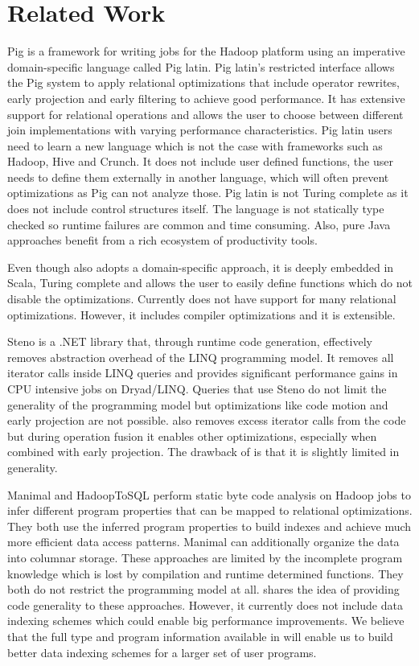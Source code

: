 \section{Related Work}
\label{sec:related-work}

Pig \cite{olston_pig_2008-1} is a framework for writing jobs for the Hadoop
platform using an imperative domain-specific language called Pig latin. Pig
latin's restricted interface allows the Pig system to apply relational
optimizations that include operator rewrites, early projection and early
filtering to achieve good performance.
It has extensive support for relational operations and allows the user to choose
between different join implementations with varying performance characteristics.
Pig latin users need to learn a new language which is not the case with
frameworks such as Hadoop, Hive and Crunch. It does not include user defined
functions, the user needs to define them externally in another language, which
will often prevent optimizations as Pig can not analyze those. Pig latin is not
Turing complete as it does not include control structures itself.
The language is not statically type checked so runtime failures are common and
time consuming. Also, pure Java approaches benefit from a rich ecosystem of
productivity tools.

Even though \tool also adopts a domain-specific approach, it is deeply embedded
in Scala, Turing complete and allows the user to easily define functions which
do not disable the optimizations. Currently \tool does not have support for many
relational optimizations. However, it includes compiler optimizations and it is
extensible.

Steno \cite{murray_steno:_2011} is a .NET library that, through runtime code
generation, effectively removes abstraction overhead of the LINQ programming
model. It removes all iterator calls inside LINQ queries and provides
significant performance gains in CPU intensive jobs on Dryad/LINQ. Queries that
use Steno do not limit the generality of the programming model but optimizations
like code motion and early projection are not possible.
\tool also removes excess iterator calls from the code but during operation
fusion it enables other optimizations, especially when combined with early
projection. The drawback of \tool is that it is slightly limited in generality.

Manimal \cite{jahani_automatic_2011} and HadoopToSQL \cite{iu_hadooptosql:_2010}
perform static byte code analysis on Hadoop jobs to infer different program
properties that can be mapped to relational optimizations. They both use the
inferred program properties to build indexes and achieve much more efficient
data access patterns. Manimal can additionally organize the data into columnar
storage. These approaches are limited by the incomplete program knowledge which
is lost by compilation and runtime determined functions. They both do not
restrict the programming model at all.
\tool shares the idea of providing code generality to these approaches. However,
it currently does not include data indexing schemes which could enable big
performance improvements. We believe that the full type and program information
available in \tool will enable us to build better data indexing schemes for a
larger set of user programs.
